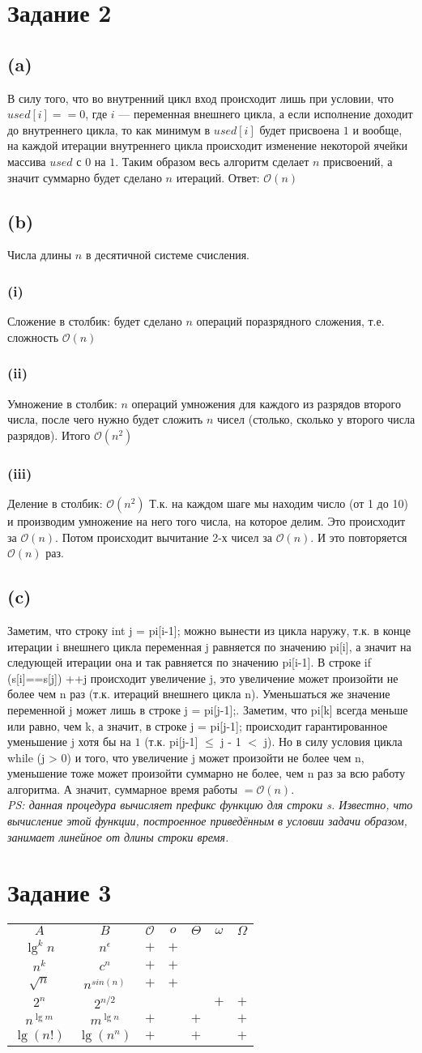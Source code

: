 \documentclass[12pt, a4paper]{article}
\newcommand{\task}[1]{\section*{Задание #1}}
\newcommand{\subtask}[1]{\subsection*{#1}}
\newcommand{\subsubtask}[1]{\subsubsection*{#1}}
\newcommand{\cd}[1]{\textsf{#1}}
\begin{document}
\newpage
\task{2}
\subtask{(a)} В силу того, что во внутренний цикл вход происходит лишь при условии, что $used[i]==0$, где $i$ --- 
переменная внешнего цикла, а если исполнение доходит до внутреннего цикла, то как минимум в $used[i]$ будет присвоена $1$
и вообще, на каждой итерации внутреннего цикла происходит изменение некоторой ячейки массива $used$ с $0$ на $1$. Таким
образом весь алгоритм сделает $n$ присвоений, а значит суммарно будет сделано $n$ итераций. Ответ: $\mathcal{O}(n)$
\subtask{(b)} 
Числа длины $n$ в десятичной системе счисления.
\subsubtask{(i)} Сложение в столбик: будет сделано $n$ операций поразрядного сложения, т.е. сложность $\mathcal{O}(n)$
\subsubtask{(ii)} Умножение в столбик: $n$ операций умножения для каждого из разрядов второго числа, после чего нужно будет
сложить $n$ чисел (столько, сколько у второго числа разрядов). Итого $\mathcal{O}(n^2)$
\subsubtask{(iii)} Деление в столбик: $\mathcal{O}(n^2)$ Т.к. на каждом шаге мы находим число (от 1 до 10) и производим 
умножение на него того числа, на которое делим. Это происходит за $\mathcal{O}(n)$. Потом происходит вычитание 2-х чисел
за $\mathcal{O}(n)$. И это повторяется $\mathcal{O}(n)$ раз.
\subtask{(c)} Заметим, что строку \cd{int j = pi[i-1];} можно вынести из цикла наружу, т.к. в конце итерации \cd{i} 
внешнего цикла переменная \cd{j} равняется по значению \cd{pi[i]}, а значит на следующей итерации она и так равняется
по значению \cd{pi[i-1]}. В строке \cd{if (s[i]==s[j]) ++j} происходит увеличение \cd{j}, это увеличение может произойти 
не более чем \cd{n} раз (т.к. итераций внешнего цикла \cd{n}). Уменьшаться же значение переменной \cd{j} может лишь в 
строке \cd{j = pi[j-1];}. Заметим, что \cd{pi[k]} всегда меньше или равно, чем \cd{k}, а значит, в строке \cd{j = pi[j-1];}
происходит гарантированное уменьшение \cd{j} хотя бы на $1$ (т.к. \cd{pi[j-1]} $\leq$ \cd{j - 1} $<$ \cd{j}). Но в силу 
условия цикла \cd{while} \cd{(j > 0)} и того, что увеличение \cd{j} может произойти не более чем \cd{n}, уменьшение тоже
может произойти суммарно не более, чем \cd{n} раз за всю работу алгоритма. А значит, суммарное время работы 
$=\mathcal{O}(n)$. 
\\\textit{PS: данная процедура вычисляет префикс функцию для строки \cd{s}. Известно, что вычисление этой функции, построенное
приведённым в условии задачи образом, занимает линейное от длины строки время.}

\task{3}
\begin{tabular}{|cc|c|c|c|c|c|}
\hline
$A$ & $B$ & $\mathcal{O}$ & $o$ & $\Theta$ & $\omega$ & $\Omega$ \\
$\lg^k{n}$ & $n^{\epsilon}$ & $+$ & $+$ &  &  &  \\
$n^k$ & $c^n$ & $+$ & $+$ & & & \\
$\sqrt{n}$ & $n^{sin(n)}$ & $+$ & $+$ & & & \\
$2^n$ & $2^{n/2}$ & & & & $+$ & $+$ \\
$n^{\lg{m}}$ & $m^{\lg{n}}$ & $+$ & & $+$ & & $+$ \\
$\lg{(n!)}$ & $\lg{(n^n)}$& $+$ & & $+$ & & $+$ \\
\hline
\end{tabular}
\end{document}
